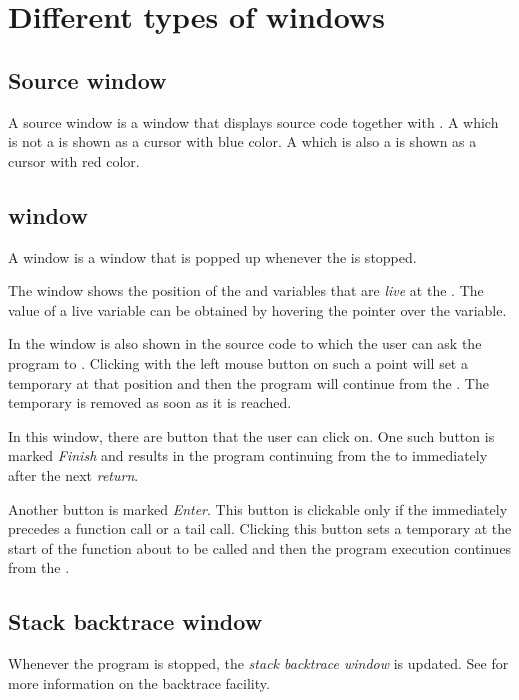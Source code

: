 \chapter{Different types of windows}

\section{Source window}
\label{sec-windows-source}

A source window is a window that displays source code together with
\pollpoints{}.  A \pollpoint{} which is not a \breakpoint{} is shown
as a cursor with blue color.  A \pollpoint{} which is also a
\breakpoint{} is shown as a cursor with red color.

\section{\Stoppingpoint{} window}
\label{sec-windows-stopping-point}

A \stoppingpoint{} window is a window that is popped up whenever 
the \applicationthread{} is stopped.

The \stoppingpoint{} window shows the position of the \stoppingpoint{}
and variables that are \emph{live} at the \stoppingpoint{}.  The value
of a live variable can be obtained by hovering the pointer over the
variable.

In the \stoppingpoint{} window is also shown \pollpoints{} in the
source code to which the user can ask the program to \emph{\dvance{}}.
Clicking with the left mouse button on such a point will set a
temporary \stoppingpoint{} at that position and then the program will
continue from the \stoppingpoint{}.  The temporary \stoppingpoint{} is
removed as soon as it is reached.

In this window, there are button that the user can click on.  One such
button is marked \emph{Finish} and results in the program continuing
from the \stoppingpoint{} to immediately after the next \emph{return}.

Another button is marked \emph{Enter}.  This button is clickable only
if the \stoppingpoint{} immediately precedes a function call or a tail
call.  Clicking this button sets a temporary \stoppingpoint{} at the
start of the function about to be called and then the program
execution continues from the \stoppingpoint{}.

\section{Stack backtrace window}

Whenever the program is stopped, the \emph{stack backtrace window} is
updated.  See  for more information on the
backtrace facility.
